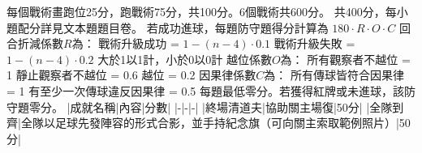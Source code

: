 {}\markdownRendererSectionBegin
{}\markdownRendererInterblockSeparator
{}每個戰術畫跑位25分，跑戰術75分，共100分。6個戰術共600分。\markdownRendererInterblockSeparator
{}
\markdownRendererSectionEnd \markdownRendererSectionBegin
{}\markdownRendererInterblockSeparator
{}共400分，每小題配分詳見文本題題目卷。\markdownRendererInterblockSeparator
{}
\markdownRendererSectionEnd \markdownRendererSectionBegin
{}\markdownRendererInterblockSeparator
{}若成功進球，每題防守題得分計算為\markdownRendererSoftLineBreak
{}$180 \cdot R \cdot O  \cdot C$\markdownRendererParagraphSeparator
{}回合折減係數$R$為：\markdownRendererInterblockSeparator
{}\markdownRendererUlBeginTight
\markdownRendererUlItem 戰術升級成功 = $1 - (n-4)\cdot 0.1$\markdownRendererUlItemEnd 
\markdownRendererUlItem 戰術升級失敗 = $1 - (n-4)\cdot 0.2$\markdownRendererUlItemEnd 
\markdownRendererUlItem 大於1以1計，小於0以0計\markdownRendererUlItemEnd 
\markdownRendererUlEndTight \markdownRendererInterblockSeparator
{}越位係數$O$為：\markdownRendererInterblockSeparator
{}\markdownRendererUlBeginTight
\markdownRendererUlItem 所有觀察者不越位 = 1\markdownRendererUlItemEnd 
\markdownRendererUlItem 靜止觀察者不越位 = 0.6\markdownRendererUlItemEnd 
\markdownRendererUlItem 越位 = 0.2\markdownRendererUlItemEnd 
\markdownRendererUlEndTight \markdownRendererInterblockSeparator
{}因果律係數$C$為：\markdownRendererInterblockSeparator
{}\markdownRendererUlBeginTight
\markdownRendererUlItem 所有傳球皆符合因果律 = 1\markdownRendererUlItemEnd 
\markdownRendererUlItem 有至少一次傳球違反因果律 = 0.5\markdownRendererUlItemEnd 
\markdownRendererUlEndTight \markdownRendererInterblockSeparator
{}每題最低零分。若獲得紅牌或未進球，該防守題零分。\markdownRendererInterblockSeparator
{}
\markdownRendererSectionEnd \markdownRendererSectionBegin
{}\markdownRendererInterblockSeparator
{}|成就名稱|內容|分數|\markdownRendererSoftLineBreak
{}|-|-|-|\markdownRendererSoftLineBreak
{}|終場清道夫|協助關主場復|50分|\markdownRendererSoftLineBreak
{}|全隊到齊|全隊以足球先發陣容的形式合影，並手持紀念旗（可向關主索取範例照片）|50分|
\markdownRendererSectionEnd 
\markdownRendererSectionEnd 
\markdownRendererSectionEnd \markdownRendererDocumentEnd